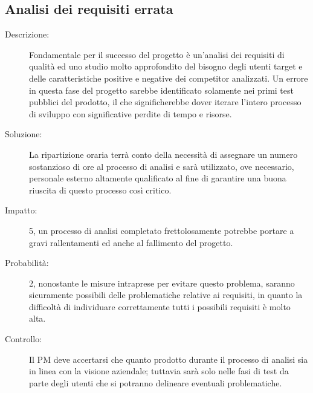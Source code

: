 \subsection{Analisi dei requisiti errata}
\begin{description}
\item[Descrizione:] Fondamentale per il successo del progetto è un'analisi dei requisiti di
qualità ed uno studio molto approfondito del bisogno degli utenti target e delle
caratteristiche positive e negative dei competitor analizzati. Un errore in questa fase
del progetto sarebbe identificato solamente nei primi test pubblici del prodotto,
il che significherebbe dover iterare l'intero processo di sviluppo con
significative perdite di tempo e risorse.
\item[Soluzione:] La ripartizione oraria terrà conto della necessità di assegnare un numero
sostanzioso di ore al processo di analisi e sarà utilizzato, ove necessario,
personale esterno altamente qualificato al fine di garantire una buona riuscita di
questo processo così critico. 
\item[Impatto:] 5, un processo di analisi completato frettolosamente potrebbe portare a gravi rallentamenti ed anche al fallimento del progetto.
\item[Probabilità:] 2, nonostante le misure intraprese per evitare questo problema, saranno sicuramente possibili delle problematiche relative ai requisiti, in quanto la difficoltà di individuare correttamente tutti i possibili requisiti è molto alta.
\item[Controllo:] Il PM deve accertarsi che quanto prodotto durante il processo di analisi sia in linea con la visione aziendale; tuttavia sarà solo nelle fasi di test da parte degli utenti che si potranno delineare eventuali problematiche.
\end{description}


